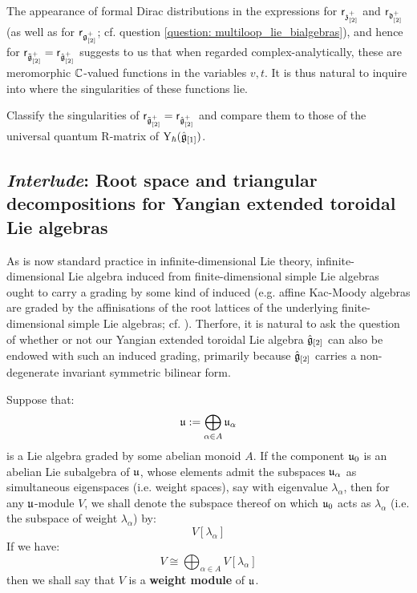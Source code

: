         \begin{remark} \label{remark: toroidal_classical_R_matrices_as_meromorphic_functions}
            The appearance of formal Dirac distributions in the expressions for $\mathsf{r}_{\mathfrak{z}_{[2]}^+}$ and $\mathsf{r}_{\mathfrak{d}_{[2]}^+}$ (as well as for $\mathsf{r}_{\mathfrak{g}_{[2]}^+}$; cf. question \ref{question: multiloop_lie_bialgebras}), and hence for $\mathsf{r}_{\tilde{\mathfrak{g}}_{[2]}^+} = \mathsf{r}_{\hat{\mathfrak{g}}_{[2]}^+}$ suggests to us that when regarded complex-analytically, these are meromorphic $\mathbb{C}$-valued functions in the variables $v, t$. It is thus natural to inquire into where the singularities of these functions lie. 
        \end{remark}
        \begin{question}
            Classify the singularities of $\mathsf{r}_{\tilde{\mathfrak{g}}_{[2]}^+} = \mathsf{r}_{\hat{\mathfrak{g}}_{[2]}^+}$ and compare them to those of the universal quantum R-matrix of $\mathrm{Y}_{\hbar}(\hat{\mathfrak{g}}_{[1]})$. 
        \end{question}

    \subsection{\textit{Interlude}: Root space and triangular decompositions for Yangian extended toroidal Lie algebras}
        As is now standard practice in infinite-dimensional Lie theory, infinite-dimensional Lie algebra induced from finite-dimensional simple Lie algebras ought to carry a grading by some kind of induced  (e.g. affine Kac-Moody algebras are graded by the affinisations of the root lattices of the underlying finite-dimensional simple Lie algebras; cf. \cite[Chapter 6]{kac_infinite_dimensional_lie_algebras}). Therfore, it is natural to ask the question of whether or not our Yangian extended toroidal Lie algebra $\hat{\mathfrak{g}}_{[2]}$ can also be endowed with such an induced grading, primarily because $\hat{\mathfrak{g}}_{[2]}$ carries a non-degenerate invariant symmetric bilinear form.  

        \begin{convention}
            Suppose that:
                $$\mathfrak{u} := \bigoplus_{\alpha \in A} \mathfrak{u}_{\alpha}$$
            is a Lie algebra graded by some abelian monoid $A$. If the component $\mathfrak{u}_0$ is an abelian Lie subalgebra of $\mathfrak{u}$, whose elements admit the subspaces $\mathfrak{u}_{\alpha}$ as simultaneous eigenspaces (i.e. weight spaces), say with eigenvalue $\lambda_{\alpha}$, then for any $\mathfrak{u}$-module $V$, we shall denote the subspace thereof on which $\mathfrak{u}_0$ acts as $\lambda_{\alpha}$ (i.e. the subspace of weight $\lambda_{\alpha}$) by:
                $$V[\lambda_{\alpha}]$$
            If we have:
                $$V \cong \bigoplus_{\alpha \in A} V[\lambda_{\alpha}]$$
            then we shall say that $V$ is a \textbf{weight module} of $\mathfrak{u}$. 
        \end{convention}

